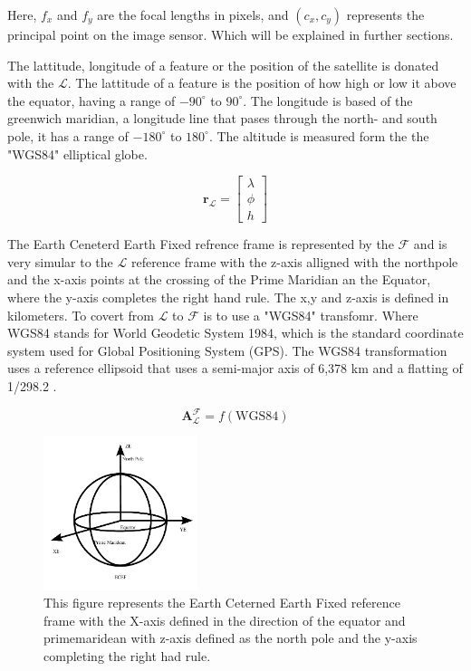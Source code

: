 Here, $f_x$ and $f_y$ are the focal lengths in pixels, and $(c_x, c_y)$ represents the principal point on the image sensor. Which will be explained in further sections.



The lattitude, longitude of a feature or the position of the satellite is donated with the $\mathcal{L}$. The lattitude of a feature is the position of how high or low it above the
equator, having a range of $-90^{\circ}$ to $90^{\circ}$. The longitude is based of the greenwich maridian, a longitude line that pases through the north- and south pole, it has a
range of $-180^{\circ}$ to $180^{\circ}$. The altitude is measured form the the "WGS84" elliptical globe.

\begin{equation}
    \mathbf{r}_\mathcal{L} = \begin{bmatrix}
    \lambda \\
    \phi \\
    h    
    \end{bmatrix} 
\end{equation}


The Earth Ceneterd Earth Fixed refrence frame is represented by the $\mathcal{F}$ and is very simular to the $\mathcal{L}$ reference frame with the z-axis alligned with the northpole
and the x-axis points at the crossing of the Prime Maridian an the Equator, where the y-axis completes the right hand rule. The x,y and z-axis is defined in kilometers.
To covert from $\mathcal{L}$ to $\mathcal{F}$ is to use a "WGS84" transfomr. Where WGS84 stands for World Geodetic System 1984, which is the standard coordinate system used for
Global Positioning System (GPS). The WGS84 transformation uses a reference ellipsoid that uses a semi-major axis of 6,378 km and a flatting of 1/298.2 .

\begin{equation}
        \mathbf{A}_{\mathcal{L}}^{\mathcal{F}} = f(\text{WGS84})
\end{equation}

\begin{figure}[H]
    \centering
    \includegraphics[width=0.4\textwidth]{figures/modelling/ECEF.pdf}
    \caption{This figure represents the Earth Ceterned Earth Fixed reference frame with the X-axis defined in the direction of the equator and primemaridean
    with z-axis defined as the north pole and the y-axis completing the right had rule.}
    \label{fig:ECEFRF}
\end{figure}

